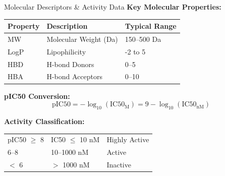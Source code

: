 \documentclass{beamer}
\begin{document}
\begin{frame}{Molecular Descriptors \& Activity Data}
    \small
    \textbf{Key Molecular Properties:}
    \begin{tabular}{lll}
        \textbf{Property} & \textbf{Description} & \textbf{Typical Range} \\
        \hline
        MW & Molecular Weight (Da) & 150--500 Da \\
        LogP & Lipophilicity & -2 to 5 \\
        HBD & H-bond Donors & 0--5 \\
        HBA & H-bond Acceptors & 0--10 \\
    \end{tabular}
    \vspace{0.5em}
    
    \textbf{pIC50 Conversion:}
    \begin{equation*}
        \text{pIC50} = -\log_{10}(\text{IC50}_{\text{M}}) = 9 - \log_{10}(\text{IC50}_{\text{nM}})
    \end{equation*}
    
    \textbf{Activity Classification:}
    \begin{tabular}{lll}
        pIC50 $\geq$ 8 & IC50 $\leq$ 10 nM & Highly Active \\
        6--8 & 10--1000 nM & Active \\
        $<$ 6 & $>$ 1000 nM & Inactive \\
    \end{tabular}
\end{frame}
\end{document}
